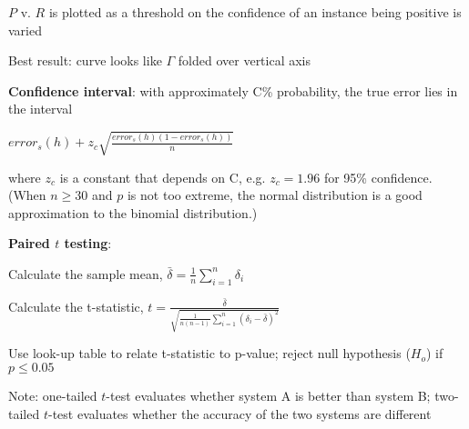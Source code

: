 \documentclass[letterpaper,fontsize=5pt]{scrartcl}
\renewenvironment{enumerate}[1]{\begin{compactenum}#1}{\end{compactenum}}
\theoremstyle{definition}
\begin{document}
\begin{multicols}{2}
\begin{enumerate}
\begin{enumerate}
\begin{enumerate}
			\item $P$ v. $R$ is plotted as a threshold on the confidence of an instance being positive is varied
			\item Best result: curve looks like $\Gamma$ folded over vertical axis
		\end{enumerate}
	\end{enumerate}
	\item \textbf{Confidence interval}: with approximately C\% probability, the true error lies in the interval \begin{center} $error_s(h) + z_c \sqrt{\frac{error_s(h)(1-error_s(h))}{n}}$ \end{center}	where $z_c$ is a constant that depends on C, e.g. $z_c = 1.96$ for 95\% confidence. (When $n \geq 30$ and $p$ is not too extreme, the normal distribution is a good approximation to the binomial distribution.)
	\item \textbf{Paired $t$ testing}:
	\begin{enumerate}
		\item Calculate the sample mean, $\bar{\delta} = \frac{1}{n} \sum\limits_{i=1}^n \delta_i$
		\item Calculate the t-statistic, $t = \frac{\bar{\delta}} {\sqrt{\frac{1}{n(n-1)}  \sum\limits_{i=1}^n (\delta_i - \bar{\delta})^2}}$
		\item Use look-up table to relate t-statistic to p-value; reject null hypothesis ($H_o$) if $p \leq 0.05$
		\item Note: one-tailed $t$-test evaluates whether system A is better than system B; two-tailed $t$-test evaluates whether the accuracy of the two systems are different
	\end{enumerate}
\end{enumerate}

\end{multicols}
\end{document}
